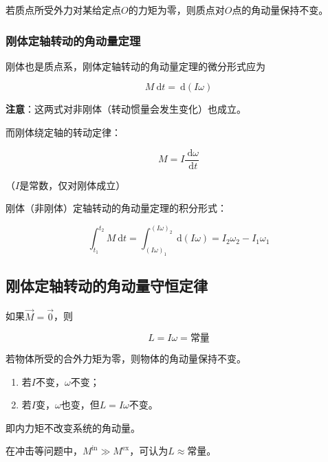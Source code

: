 \documentclass[12pt, a4paper]{article}
\numberwithin{equation}{section}
\newcommand{\rmd}{\mathrm{~d}}
\newcommand{\deriv}[2]{\frac{\rmd #1}{\rmd #2}}
\begin{document}
    若质点所受外力对某给定点\(O\)的力矩为零，则质点对\(O\)点的角动量保持不变。

\subsubsection{刚体定轴转动的角动量定理}

    刚体也是质点系，刚体定轴转动的角动量定理的微分形式应为

    \begin{equation}
        M \rmd t = \rmd \left(I \omega\right)
    \end{equation}

    \textbf{注意}：这两式对非刚体（转动惯量会发生变化）也成立。

    而刚体绕定轴的转动定律：

    \begin{equation}
        M = I \deriv{\omega}{t}
    \end{equation}

    （\(I\)是常数，仅对刚体成立）

    刚体（非刚体）定轴转动的角动量定理的积分形式：

    \begin{equation}
        \int_{t_1}^{t_2} M \mathrm{~d} t=\int_{\left(I \omega\right)_1}^{\left(I \omega\right)_2} \rmd \left(I \omega\right)
        =I_2 \omega_2-I_1 \omega_1
    \end{equation}

\subsection{刚体定轴转动的角动量守恒定律}

    如果\(\overrightarrow{M}=\overrightarrow{0}\)，则

    \begin{equation}
        L = I \omega = \text{常量}
    \end{equation}

    若物体所受的合外力矩为零，则物体的角动量保持不变。

    \begin{enumerate}
        \item 若\(I\)不变，\(\omega\)不变；
        \item 若\(I\)变，\(\omega\)也变，但\(L = I \omega\)不变。
    \end{enumerate}

    即内力矩不改变系统的角动量。

    在冲击等问题中，\(M^{\text{in}} \gg  M^{\text{ex}}\)，可认为\(L \approx \text{常量}\)。
\end{document}

